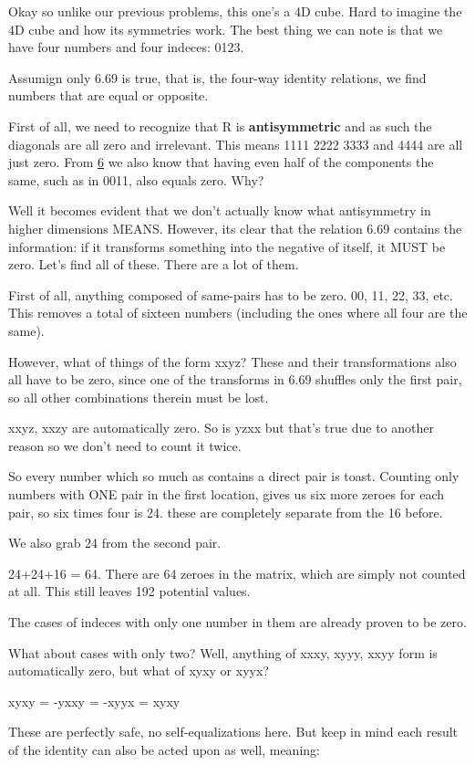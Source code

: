 \documentclass[landscape,letterpaper,10pt,english]{article}
\begin{document}
    Okay so unlike our previous problems, this one's a 4D cube. Hard to
imagine the 4D cube and how its symmetries work. The best thing we can
note is that we have four numbers and four indeces: 0123.

Assumign only 6.69 is true, that is, the four-way identity relations, we
find numbers that are equal or opposite.

First of all, we need to recognize that R is \textbf{antisymmetric} and
as such the diagonals are all zero and irrelevant. This means 1111 2222
3333 and 4444 are all just zero. From \hyperref[6]{6} we also know that
having even half of the components the same, such as in 0011, also
equals zero. Why?

Well it becomes evident that we don't actually know what antisymmetry in
higher dimensions MEANS. However, its clear that the relation 6.69
contains the information: if it transforms something into the negative
of itself, it MUST be zero. Let's find all of these. There are a lot of
them.

First of all, anything composed of same-pairs has to be zero. 00, 11,
22, 33, etc. This removes a total of sixteen numbers (including the ones
where all four are the same).

However, what of things of the form xxyz? These and their
transformations also all have to be zero, since one of the transforms in
6.69 shuffles only the first pair, so all other combinations therein
must be lost.

xxyz, xxzy are automatically zero. So is yzxx but that's true due to
another reason so we don't need to count it twice.

So every number which so much as contains a direct pair is toast.
Counting only numbers with ONE pair in the first location, gives us six
more zeroes for each pair, so six times four is 24. these are completely
separate from the 16 before.

We also grab 24 from the second pair.

24+24+16 = 64. There are 64 zeroes in the matrix, which are simply not
counted at all. This still leaves 192 potential values.

    The cases of indeces with only one number in them are already proven to
be zero.

What about cases with only two? Well, anything of xxxy, xyyy, xxyy form
is automatically zero, but what of xyxy or xyyx?

xyxy = -yxxy = -xyyx = xyxy

These are perfectly safe, no self-equalizations here. But keep in mind
each result of the identity can also be acted upon as well, meaning:
\end{document}
